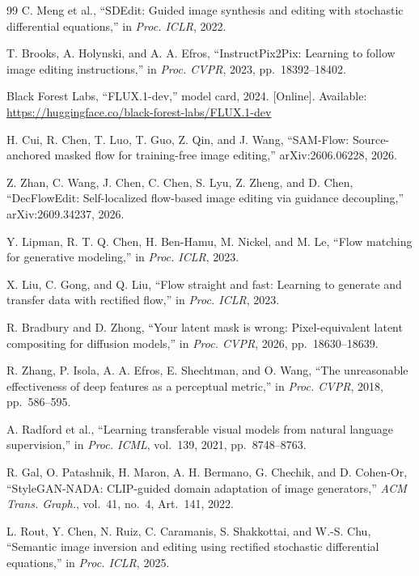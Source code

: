 \begin{thebibliography}{99}
C. Meng et al., ``SDEdit: Guided image synthesis and editing with stochastic differential equations,'' in \emph{Proc. ICLR}, 2022.

T. Brooks, A. Holynski, and A. A. Efros, ``InstructPix2Pix: Learning to follow image editing instructions,'' in \emph{Proc. CVPR}, 2023, pp.~18392--18402.

Black Forest Labs, ``FLUX.1-dev,'' model card, 2024. [Online]. Available: \url{https://huggingface.co/black-forest-labs/FLUX.1-dev}

H. Cui, R. Chen, T. Luo, T. Guo, Z. Qin, and J. Wang, 
``SAM-Flow: Source-anchored masked flow for training-free image editing,'' arXiv:2606.06228, 2026.

Z. Zhan, C. Wang, J. Chen, C. Chen, S. Lyu, Z. Zheng, and D. Chen,
``DecFlowEdit: Self-localized flow-based image editing via guidance decoupling,'' arXiv:2609.34237, 2026.

Y. Lipman, R. T. Q. Chen, H. Ben-Hamu, M. Nickel, and M. Le,
``Flow matching for generative modeling,'' in \emph{Proc. ICLR}, 2023.

X. Liu, C. Gong, and Q. Liu,
``Flow straight and fast: Learning to generate and transfer data with rectified flow,'' in \emph{Proc. ICLR}, 2023.

R. Bradbury and D. Zhong, ``Your latent mask is wrong: Pixel-equivalent latent compositing for diffusion models,''
in \emph{Proc. CVPR}, 2026, pp.~18630--18639.

R. Zhang, P. Isola, A. A. Efros, E. Shechtman, and O. Wang,
``The unreasonable effectiveness of deep features as a perceptual metric,'' in \emph{Proc. CVPR}, 2018, pp.~586--595.

A. Radford et al.,
``Learning transferable visual models from natural language supervision,'' in \emph{Proc. ICML}, vol.~139, 2021, pp.~8748--8763.

R. Gal, O. Patashnik, H. Maron, A. H. Bermano, G. Chechik, and D. Cohen-Or, ``StyleGAN-NADA: CLIP-guided domain adaptation of image generators,'' \emph{ACM Trans. Graph.}, vol.~41, no.~4, Art.~141, 2022.

L. Rout, Y. Chen, N. Ruiz, C. Caramanis, S. Shakkottai, and W.-S. Chu,
``Semantic image inversion and editing using rectified stochastic differential equations,'' in \emph{Proc. ICLR}, 2025.


\end{thebibliography}
